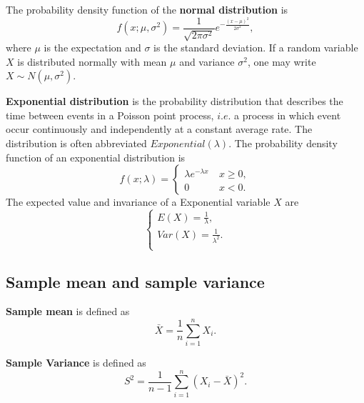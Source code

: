 \documentclass[10pt,onecolumn]{book}
\begin{document}
The probability density function of the \textbf{normal distribution} is
\begin{equation}
f(x; \mu, \sigma^2) = \frac{1}{\sqrt{2 \pi \sigma^2}} e^{-\frac{(x - \mu)^2}{2\sigma^2}},
\end{equation}
where $\mu$ is the expectation and $\sigma$ is the standard deviation. If a random variable $X$ is distributed normally with mean $\mu$ and variance $\sigma^2$, one may write $X \sim N(\mu, \sigma^2)$. 

\textbf{Exponential distribution} is the probability distribution that describes the time between events in a Poisson point process, $i.e.$ a process in which event occur continuously and independently at a constant average rate. The distribution is often abbreviated $Exponential(\lambda)$. The probability density function of an exponential distribution is 
\begin{equation}
f(x;\lambda)=
\left\{
	\begin{array}{ll}
		\lambda e ^ {- \lambda x} \ & x \ge 0, \\
		0						    & x < 0.
	\end{array}
\right.
\end{equation}
The expected value and invariance of a Exponential variable $X$ are
\begin{equation}
\left\{
	\begin{array}{lr}
	E(X) = \frac{1}{\lambda}, \\
	Var(X) = \frac{1}{\lambda ^ 2}. \\	
	\end{array}
\right.
\end{equation}

\subsection{Sample mean and sample variance}
\textbf{Sample mean} is defined as
\begin{equation}
\bar{X} = \frac{1}{n} \sum_{i=1}^n X_i.
\end{equation}

\textbf{Sample Variance} is defined as 
\begin{equation}
S^2 = \frac{1}{n - 1} \sum_{i=1}^n(X_i - \bar{X})^2.
\end{equation}
\end{document}
